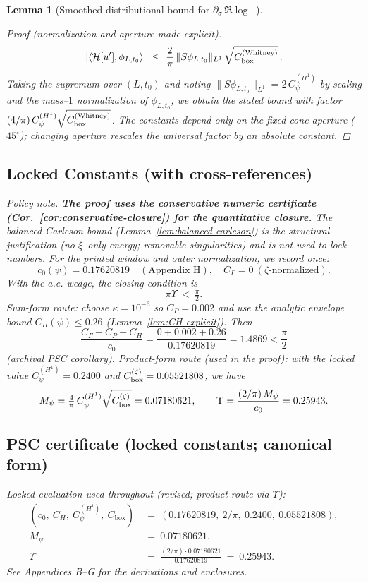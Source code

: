 \documentclass[11pt]{article}
\providecommand{\CboxZeta}{0.05521808}%
\providecommand{\Mpsilocked}{0.07180621}%
\providecommand{\UpsilonLocked}{0.25943}%
\newtheorem{lemma}[theorem]{Lemma}
\theoremstyle{definition}
\theoremstyle{remark}
\DeclareMathOperator{\dettwo}{det_2}
\begin{document}
\begin{lemma}[Smoothed distributional bound for $\partial_\sigma\,\Re\log\dettwo$]
\begin{proof}[Proof (normalization and aperture made explicit)]
\[
 |\langle \mathcal H[u'],\phi_{L,t_0}\rangle|\ \le\ \frac{2}{\pi}\,\|S\phi_{L,t_0}\|_{L^1}\,\sqrt{C_{\rm box}^{(\mathrm{Whitney})}}\,.
\]
Taking the supremum over $(L,t_0)$ and noting $\|S\phi_{L,t_0}\|_{L^1}=2\,C_\psi^{(H^1)}$ by scaling and the mass--$1$ normalization of $\phi_{L,t_0}$, we obtain the stated bound with factor $(4/\pi)\,C_\psi^{(H^1)}\sqrt{C_{\rm box}^{(\mathrm{Whitney})}}$. The constants depend only on the fixed cone aperture ($45^\circ$); changing aperture rescales the universal factor by an absolute constant.
\end{proof}

\subsection*{Locked Constants (with cross-references)}
\noindent\emph{Policy note.} \textbf{The proof uses the conservative numeric certificate (Cor.~\ref{cor:conservative-closure}) for the quantitative closure.} The balanced Carleson bound (Lemma~\ref{lem:balanced-carleson}) is the structural justification (no $\xi$--only energy; removable singularities) and is not used to lock numbers.
\noindent For the printed window and outer normalization, we record once:
\[
 c_0(\psi)=0.17620819\quad(\text{Appendix H}),\quad C_\Gamma=0\ (\zeta\text{-normalized}).
\]
With the a.e. wedge, the closing condition is
\[ \pi\Upsilon\ <\ \tfrac{\pi}{2}. \]
Sum-form route: choose \(\kappa=10^{-3}\) so \(C_P=0.002\) and use the analytic envelope bound \(C_H(\psi)\le 0.26\) (Lemma~\ref{lem:CH-explicit}). Then
\[\frac{C_\Gamma+C_P+C_H}{c_0}=\frac{0+0.002+0.26}{0.17620819}=1.4869<\frac{\pi}{2}\] (archival PSC corollary).
Product-form route (used in the proof): with the locked value \(C_\psi^{(H^1)}=0.2400\) and \(C_{\rm box}^{(\zeta)}=\CboxZeta\), we have
\[ M_\psi= \tfrac{4}{\pi}\,C_\psi^{(H^1)}\sqrt{C_{\rm box}^{(\zeta)}}= \Mpsilocked,\qquad \Upsilon=\frac{(2/\pi)\,M_\psi}{c_0}=\UpsilonLocked.\]
\subsection*{PSC certificate (locked constants; canonical form)}
\noindent\textit{Locked evaluation used throughout (revised; product route via $\Upsilon$):}
\begin{align*}
 (c_0,\ C_H,\ C_\psi^{(H^1)},\ C_{\mathrm{box}})
 &\ =\ (0.17620819,\ 2/\pi,\ 0.2400,\ \CboxZeta),\\
 M_\psi\ &\ =\ \Mpsilocked,\\
 \Upsilon\ &\ =\ \frac{(2/\pi)\cdot \Mpsilocked}{0.17620819}\ =\ \UpsilonLocked. 
\end{align*}
See Appendices B--G for the derivations and enclosures.


\end{lemma}
\end{document}
